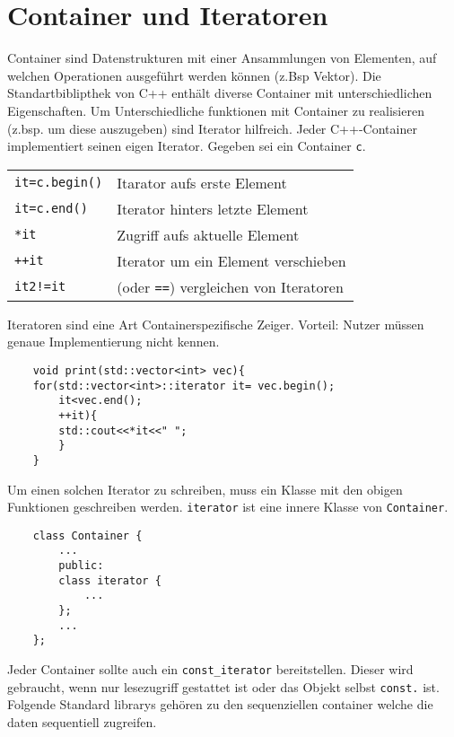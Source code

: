 \section{Container und Iteratoren}
Container sind Datenstrukturen mit einer Ansammlungen von Elementen, auf welchen Operationen ausgeführt werden können (z.Bsp Vektor).
Die Standartbiblipthek von C++ enthält diverse Container mit unterschiedlichen Eigenschaften. 
Um Unterschiedliche funktionen mit Container zu realisieren (z.bsp. um diese auszugeben) sind Iterator hilfreich. Jeder C++-Container implementiert seinen eigen Iterator. Gegeben sei ein Container \texttt{c}.
\begin{tabular}{p{}|p{}}
	\texttt{it=c.begin()} & Itarator aufs erste Element\\
	\texttt{it=c.end()} & Iterator hinters letzte Element\\
	\texttt{*it} & Zugriff aufs aktuelle Element\\
	\texttt{++it} & Iterator um ein Element verschieben\\
	\texttt{it2!=it} & (oder \texttt{==}) vergleichen von Iteratoren
\end{tabular}
Iteratoren sind eine Art Containerspezifische Zeiger. Vorteil: Nutzer müssen genaue Implementierung nicht kennen.
\begin{lstlisting}
	void print(std::vector<int> vec){
	for(std::vector<int>::iterator it= vec.begin();
		it<vec.end();
		++it){
		std::cout<<*it<<" ";
		}
	}
\end{lstlisting}
Um einen solchen Iterator zu schreiben, muss ein Klasse mit den obigen Funktionen geschreiben werden. \texttt{iterator} ist eine innere Klasse von \texttt{Container}.
\begin{lstlisting}
	class Container {
		...
		public:
		class iterator {
			...
		};
		...
	};
\end{lstlisting}
Jeder Container sollte auch ein \texttt{const\_iterator} bereitstellen. Dieser wird gebraucht, wenn nur lesezugriff gestattet ist oder das Objekt selbst \texttt{const.} ist.\\
Folgende Standard librarys gehören zu den sequenziellen container welche die daten sequentiell zugreifen.

